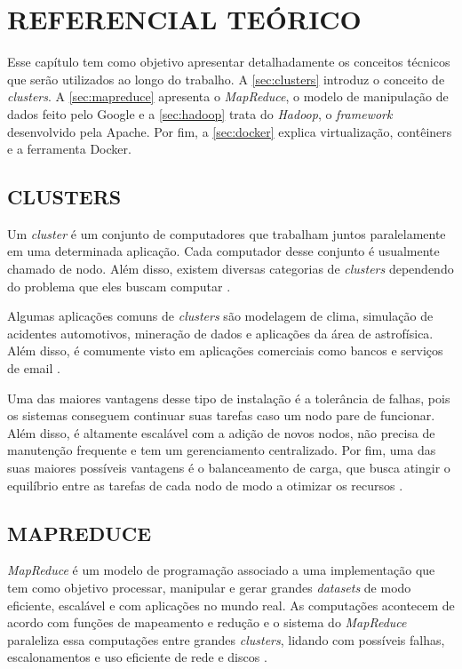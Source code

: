 \chapter{REFERENCIAL TEÓRICO} \label{cha:refteorico}

Esse capítulo tem como objetivo apresentar detalhadamente os conceitos técnicos que serão utilizados ao longo do trabalho. A \autoref{sec:clusters} introduz o conceito de \textit{clusters}. A \autoref{sec:mapreduce} apresenta o \textit{MapReduce}, o modelo de manipulação de dados feito pelo Google e a \autoref{sec:hadoop} trata do \textit{Hadoop}, o \textit{\gls{framework}} desenvolvido pela Apache. Por fim, a \autoref{sec:docker} explica virtualização, contêiners e a ferramenta Docker.

\section{CLUSTERS} \label{sec:clusters}

Um \textit{cluster} é um conjunto de computadores que trabalham juntos paralelamente em uma determinada aplicação. Cada computador desse conjunto é usualmente chamado de nodo. Além disso, existem diversas categorias de \textit{clusters} dependendo do problema que eles buscam computar \cite{GoldmanApache12}.

Algumas aplicações comuns de \textit{clusters} são modelagem de clima, simulação de acidentes automotivos, mineração de dados e aplicações da área de astrofísica. Além disso, é comumente visto em aplicações comerciais como bancos e serviços de email \cite{ClusterGridCloudComparison11}.

Uma das maiores vantagens desse tipo de instalação é a tolerância de falhas, pois os sistemas conseguem continuar suas tarefas caso um nodo pare de funcionar. Além disso, é altamente escalável com a adição de novos nodos, não precisa de manutenção frequente e tem um gerenciamento centralizado. Por fim, uma das suas maiores possíveis vantagens é o balanceamento de carga, que busca atingir o equilíbrio entre as tarefas de cada nodo de modo a otimizar os recursos \cite{ClusterGridCloudComparison11}.

\section{MAPREDUCE} \label{sec:mapreduce}

\textit{MapReduce} é um modelo de programação associado a uma implementação que tem como objetivo processar, manipular e gerar grandes \textit{datasets} de modo eficiente, escalável e com aplicações no mundo real. As computações acontecem de acordo com funções de mapeamento e redução e o sistema do \textit{MapReduce} paraleliza essa computações entre grandes \textit{clusters}, lidando com possíveis falhas, escalonamentos e uso eficiente de rede e discos \cite{MapReduce08}.

